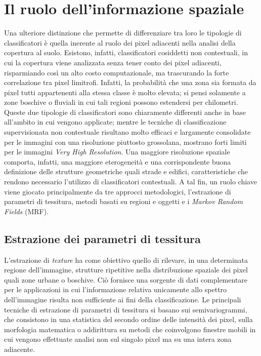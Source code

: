 \section{Il ruolo dell'informazione spaziale}

Una ulteriore distinzione che permette di differenziare tra loro le tipologie di classificatori è quella inerente al ruolo dei pixel adiacenti nella analisi della copertura al suolo. Esistono, infatti, classificatori cosiddetti non contestuali, in cui la copertura viene analizzata senza tener conto dei pixel adiacenti, risparmiando così un alto costo computazionale, ma trascurando la forte correlazione tra pixel limitrofi. Infatti, la probabilità che una zona sia formata da pixel tutti appartenenti alla stessa classe è molto elevata; si pensi solamente a zone boschive o fluviali in cui tali regioni possono estendersi per chilometri. 
\\

Queste due tipologie di classificatori sono chiaramente differenti anche in base all'ambito in cui vengono applicate; mentre le tecniche di classificazione supervisionata non contestuale risultano molto efficaci e largamente consolidate per le immagini con una risoluzione piuttosto grossolana, mostrano forti limiti per le immagini \emph{Very High Resolution}. 
Una maggiore risoluzione spaziale comporta, infatti, una maggiore eterogeneità e una corrispondente buona definizione delle strutture geometriche quali strade e edifici, caratteristiche che rendono necessario l'utilizzo di classificatori contestuali. 
A tal fin, un ruolo chiave viene giocato principalmente da tre approcci metodologici, l'estrazione di parametri di tessitura, metodi basati su regioni e oggetti e i \emph{Markov Random Fields} (MRF).


\subsection{Estrazione dei parametri di tessitura}
L'estrazione di \emph{texture} ha come obiettivo quello di rilevare, in una determinata regione dell'immagine, strutture ripetitive nella distribuzione spaziale dei pixel quali zone urbane o boschive. 
Ciò fornisce una sorgente di dati complementare per le applicazioni in cui l'informazione relativa unicamente allo spettro dell'immagine risulta non sufficiente ai fini della classificazione. 
Le principali tecniche di estrazione di parametri di tessitura si basano sui semivariogrammi, che consistono in una statistica del secondo ordine delle intensità dei pixel, sulla morfologia matematica o addirittura su metodi che coinvolgono finestre mobili in cui vengono effettuate analisi non sul singolo pixel ma su una intera zona adiacente. 



